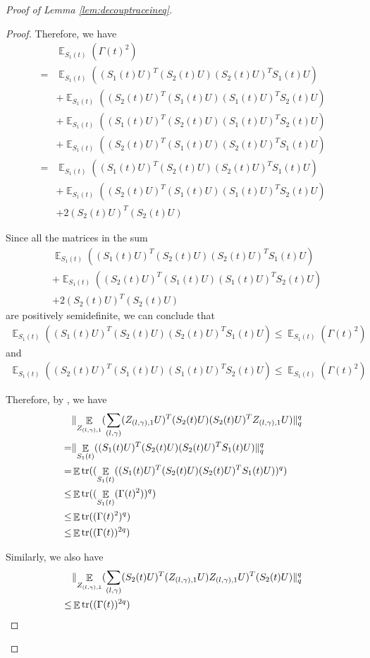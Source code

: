 \documentclass[11pt]{amsart}
\numberwithin{equation}{section}
\numberwithin{equation}{section}
\DeclareMathOperator{\E}{\mathbb{E}}
\DeclareMathOperator*{\tr}{tr}
\DeclarePairedDelimiter{\norm}{\lVert}{\rVert}
\theoremstyle{remark}
\theoremstyle{definition}
\begin{document}
\begin{proof}[Proof of Lemma \ref{lem:decouptraceineq}]
\begin{proof}
Therefore, we have
\begin{align*}
    &\E_{S_1(t)}(\Gamma(t)^2)\\=&\E_{S_1(t)}((S_1(t)U)^T(S_2(t)U)(S_2(t)U )^TS_1(t)U)\\&+\E_{S_1(t)}((S_2(t)U)^T(S_1(t)U)(S_1(t)U )^TS_2(t)U)\\&+\E_{S_1(t)}((S_1(t)U)^T(S_2(t)U)(S_1(t)U )^TS_2(t)U)\\&+\E_{S_1(t)}((S_2(t)U)^T(S_1(t)U)(S_2(t)U )^TS_1(t)U)
    \\=&\E_{S_1(t)}((S_1(t)U)^T(S_2(t)U)(S_2(t)U )^TS_1(t)U)\\&+\E_{S_1(t)}((S_2(t)U)^T(S_1(t)U)(S_1(t)U )^TS_2(t)U)\\&+2(S_2(t)U)^T(S_2(t)U )
\end{align*}

Since all the matrices in the sum \begin{align*}&\E_{S_1(t)}((S_1(t)U)^T(S_2(t)U)(S_2(t)U )^TS_1(t)U)\\&+\E_{S_1(t)}((S_2(t)U)^T(S_1(t)U)(S_1(t)U )^TS_2(t)U)\\&+2(S_2(t)U)^T(S_2(t)U )\end{align*} are positively semidefinite, we can conclude that
\begin{align*}
    \E_{S_1(t)}((S_1(t)U)^T(S_2(t)U)(S_2(t)U )^TS_1(t)U) \le \E_{S_1(t)}(\Gamma(t)^2)
\end{align*}
and
\begin{align*}
    \E_{S_1(t)}((S_2(t)U)^T(S_1(t)U)(S_1(t)U )^TS_2(t)U) \le \E_{S_1(t)}(\Gamma(t)^2)
\end{align*}

Therefore, by \cite[Theorem 2.10]{carlen2010trace}, we have
\begin{align*}
    &\norm{\E_{Z_{(l,\gamma),1}}(\sum_{(l,\gamma)}(Z_{(l,\gamma),1}U)^T(S_2(t)U)(S_2(t)U )^TZ_{(l,\gamma),1}U)}_{q}^q
    \\=&\norm{\E_{S_1(t)}((S_1(t)U)^T(S_2(t)U)(S_2(t)U )^TS_1(t)U)}_{q}^q
    \\=&\E \tr((\E_{S_1(t)}((S_1(t)U)^T(S_2(t)U)(S_2(t)U )^TS_1(t)U))^q)
    \\ \le & \E \tr((\E_{S_1(t)}(\Gamma(t)^2))^q)
    \\ \le & \E \tr((\Gamma(t)^2)^q)
    \\ \le & \E \tr((\Gamma(t))^{2q})
\end{align*}

Similarly, we also have
\begin{align*}
    &\norm{\E_{Z_{(l,\gamma),1}}(\sum_{(l,\gamma)}(S_2(t)U)^T(Z_{(l,\gamma),1}U)Z_{(l,\gamma),1}U)^T(S_2(t)U )}_{q}^q
    \\ \le & \E \tr((\Gamma(t))^{2q})
\end{align*}


\end{proof}
\end{proof}
\end{document}
